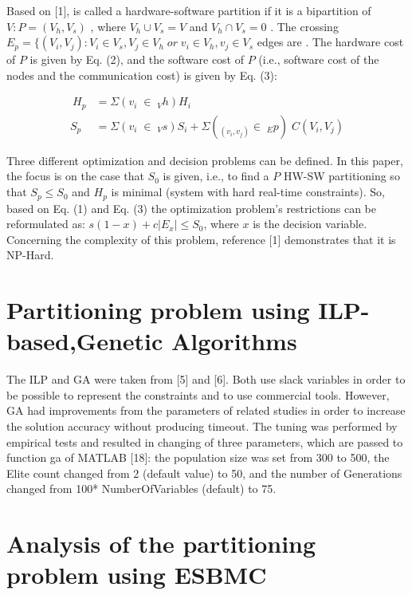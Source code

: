 Based on [1],  is called a hardware-software partition if it is a bipartition of $ V:P = (V_h, V_s) $ , where $ V_h \cup V_s = V $  and $ V_h \cap V_s = 0$  . The crossing $ E_p = \{(V_i,V_j):V_i \in V_s, V_j \in V_h \;or\; v_i \in V_h, v_j \in V_s $ edges are . The hardware cost of $ P $  is given by Eq. (2), and the software cost of $ P $ (i.e., software cost of the nodes and the communication cost) is given by Eq. (3):

\begin{align}
\ H_p &= \Sigma (v_i \;\in\; _Vh) H_i\\
  S_p &= \Sigma (v_i \;\in\; _Vs) S_i + \Sigma (_(v_i,v_j) \in\; _Ep)\; C(V_i, V_j)
\end{align}

Three different optimization and decision problems can be defined. In this paper, the focus is on the case that $ S_0 $ is given, i.e., to find a $ P $ HW-SW partitioning so that $ S_p \leq S_0 $ and $ H_p $ is minimal (system with hard real-time constraints). So, based on Eq. (1) and Eq. (3) the optimization problem’s restrictions can be reformulated as: $ s(1-x) + c|E_x| \leq S_0 $, where $ x $ is the decision variable. Concerning the complexity of this problem, reference [1] demonstrates that it is NP-Hard.

\section{Partitioning problem using ILP-based,Genetic Algorithms}
\label{ILPGA}

The ILP and GA were taken from [5] and [6]. Both use slack variables in order to be possible to represent the constraints and to use commercial tools. However, GA had improvements from the parameters of related studies in order to increase the solution accuracy without producing timeout. The tuning was performed by empirical tests and resulted in changing of three parameters, which are passed to function ga of MATLAB [18]: the population size was set from 300 to 500, the Elite count changed from 2 (default value) to 50, and the number of Generations changed from 100* NumberOfVariables (default) to 75.

\section{Analysis of the partitioning problem using ESBMC}

